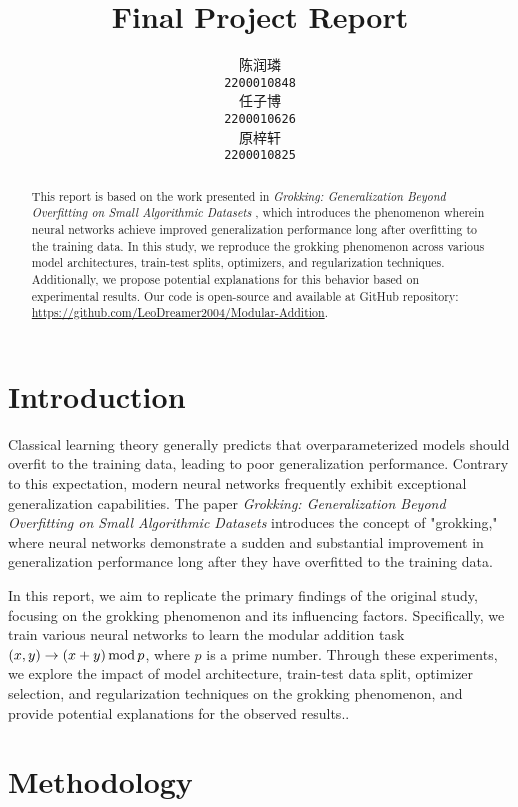 \documentclass{article}
\title{Final Project Report}
\author{
    陈润璘 \\
    \texttt{2200010848} \\
    \And
    任子博 \\
    \texttt{2200010626} \\
    \And
    原梓轩 \\
    \texttt{2200010825} \\
}
\begin{document}
\maketitle

\begin{abstract}
    This report is based on the work presented in \textit{Grokking: Generalization Beyond Overfitting on Small Algorithmic Datasets} \cite{power2022grokking}, which introduces the phenomenon wherein neural networks achieve improved generalization performance long after overfitting to the training data. In this study, we reproduce the grokking phenomenon across various model architectures, train-test splits, optimizers, and regularization techniques. Additionally, we propose potential explanations for this behavior based on experimental results. Our code is open-source and available at GitHub repository: \url{https://github.com/LeoDreamer2004/Modular-Addition}.
\end{abstract}

\section{Introduction}

Classical learning theory generally predicts that overparameterized models should overfit to the training data, leading to poor generalization performance. Contrary to this expectation, modern neural networks frequently exhibit exceptional generalization capabilities. The paper \textit{Grokking: Generalization Beyond Overfitting on Small Algorithmic Datasets} introduces the concept of "grokking," where neural networks demonstrate a sudden and substantial improvement in generalization performance long after they have overfitted to the training data.

In this report, we aim to replicate the primary findings of the original study, focusing on the grokking phenomenon and its influencing factors. Specifically, we train various neural networks to learn the modular addition task $(x, y) \rightarrow (x + y)\, {\rm mod}\, p$, where $p$ is a prime number. Through these experiments, we explore the impact of model architecture, train-test data split, optimizer selection, and regularization techniques on the grokking phenomenon, and provide potential explanations for the observed results..

\section{Methodology}
\end{document}
